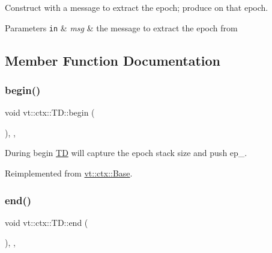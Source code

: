 Construct with a message to extract the epoch; produce on that epoch. 


\begin{DoxyParams}[1]{Parameters}
\mbox{\tt in}  & {\em msg} & the message to extract the epoch from \\
\hline
\end{DoxyParams}


\subsection{Member Function Documentation}
\mbox{\label{structvt_1_1ctx_1_1_t_d_a5ba29186cd3ac75a48272e0ac050228b}} 
\subsubsection{\texorpdfstring{begin()}{begin()}}
{\footnotesize\ttfamily void vt\+::ctx\+::\+T\+D\+::begin (\begin{DoxyParamCaption}{ }\end{DoxyParamCaption})\hspace{0.3cm}{\ttfamily [final]}, {\ttfamily [override]}, {\ttfamily [virtual]}}



During begin {\ttfamily \hyperlink{structvt_1_1ctx_1_1_t_d}{TD}} will capture the epoch stack size and push {\ttfamily ep\+\_\+}. 



Reimplemented from \hyperlink{structvt_1_1ctx_1_1_base_aab5524952e1bb163ccba5df64a303168}{vt\+::ctx\+::\+Base}.

\mbox{\label{structvt_1_1ctx_1_1_t_d_a5131b9af6b389c90c1ac908c7dcc59b9}} 
\subsubsection{\texorpdfstring{end()}{end()}}
{\footnotesize\ttfamily void vt\+::ctx\+::\+T\+D\+::end (\begin{DoxyParamCaption}{ }\end{DoxyParamCaption})\hspace{0.3cm}{\ttfamily [final]}, {\ttfamily [override]}, {\ttfamily [virtual]}}



